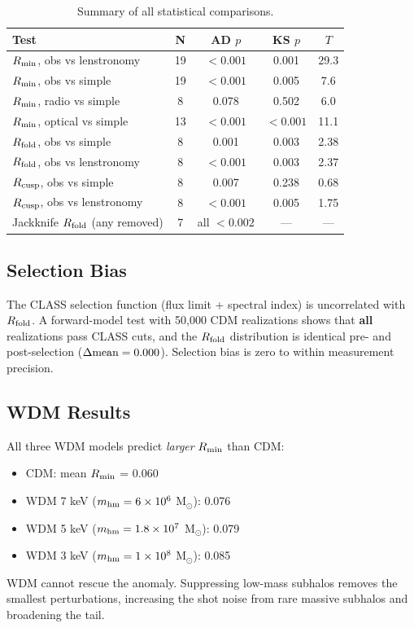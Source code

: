 \documentclass[12pt]{article}
\newcommand{\rfold}{\ensuremath{R_{\rm fold}}}
\newcommand{\rcusp}{\ensuremath{R_{\rm cusp}}}
\newcommand{\rmin}{\ensuremath{R_{\rm min}}}
\begin{document}
\begin{table}
\centering
\caption{Summary of all statistical comparisons.}
\label{tab:results}
\begin{tabular}{lcccc}
\hline
Test & N & AD $p$ & KS $p$ & $T$ \\
\hline
\rmin{}, obs vs lenstronomy & 19 & $<0.001$ & 0.001 & 29.3 \\
\rmin{}, obs vs simple & 19 & $<0.001$ & 0.005 & 7.6 \\
\rmin{}, radio vs simple & 8 & 0.078 & 0.502 & 6.0 \\
\rmin{}, optical vs simple & 13 & $<0.001$ & $<0.001$ & 11.1 \\
\rfold{}, obs vs simple & 8 & 0.001 & 0.003 & 2.38 \\
\rfold{}, obs vs lenstronomy & 8 & $<0.001$ & 0.003 & 2.37 \\
\rcusp{}, obs vs simple & 8 & 0.007 & 0.238 & 0.68 \\
\rcusp{}, obs vs lenstronomy & 8 & $<0.001$ & 0.005 & 1.75 \\
Jackknife \rfold{} (any removed) & 7 & all $<0.002$ & --- & --- \\
\hline
\end{tabular}
\end{table}

\subsection{Selection Bias}
\label{sec:selection}

The CLASS selection function (flux limit + spectral index) is uncorrelated
with \rfold{}. A forward-model test with 50,000 CDM realizations shows that
\textbf{all} realizations pass CLASS cuts, and the \rfold{} distribution is
identical pre- and post-selection ($\Delta{\rm mean} = 0.000$).
Selection bias is zero to within measurement precision.

\subsection{WDM Results}
\label{sec:wdm_results}

All three WDM models predict \emph{larger} \rmin{} than CDM:
\begin{itemize}
\item CDM: mean \rmin{} = 0.060
\item WDM 7 keV ($m_{\rm hm} = 6\times10^6$ M$_\odot$): 0.076
\item WDM 5 keV ($m_{\rm hm} = 1.8\times10^7$ M$_\odot$): 0.079
\item WDM 3 keV ($m_{\rm hm} = 1\times10^8$ M$_\odot$): 0.085
\end{itemize}
WDM cannot rescue the anomaly. Suppressing low-mass subhalos removes
the smallest perturbations, increasing the shot noise from rare massive
subhalos and broadening the tail.
\end{document}
